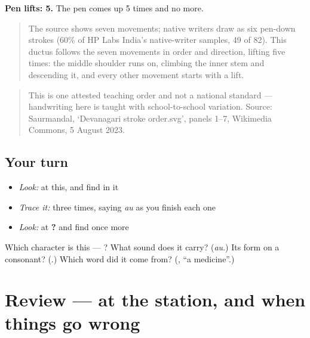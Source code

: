 \textbf{Pen lifts: 5.} The pen comes up 5 times and no more.

\begin{quote}
The source shows seven movements; native writers draw  as six pen-down strokes (60\% of HP Labs India's native-writer samples, 49 of 82). This ductus follows the seven movements in order and direction, lifting five times: the middle shoulder runs on, climbing the inner stem and descending it, and every other movement starts with a lift.
\end{quote}

\begin{quote}
This is one attested teaching order and not a national standard — handwriting here is taught with school-to-school variation. Source: Saurmandal, ‘Devanagari  stroke order.svg’, panels 1–7, Wikimedia Commons, 5 August 2023.
\end{quote}

\subsection*{Your turn}
\begin{itemize}
\raggedright
  \item \emph{Look:} at this, and find  in it
\end{itemize}

\begin{quote}
\end{quote}

\begin{itemize}
\raggedright
  \item \emph{Trace it:}  three times, saying \emph{au} as you finish each one
  \item \emph{Look:} at \textbf{  ?} and find  once more
\end{itemize}

\begin{tcolorbox}[breakable,colback=teal!4,colframe=teal!35!black,title={Before you move on}]
Which character is this — ? What sound does it carry? (\emph{au}.) Its form on a consonant? (\textbf{}.) Which word did it come from? (\textbf{}, \textquotedblleft{}a medicine\textquotedblright{}.)
\end{tcolorbox}
\section[(review)]{Review — at the station, and when things go wrong}

